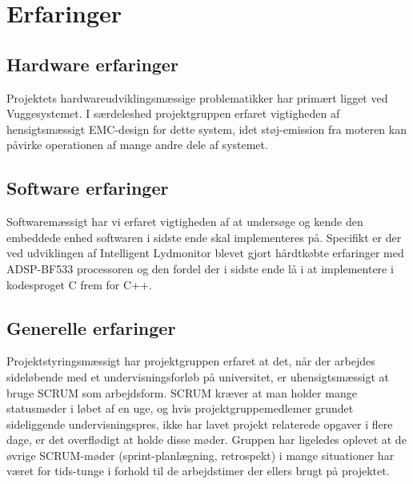 \chapter{Erfaringer}

\section{Hardware erfaringer}
Projektets hardwareudviklingsmæssige problematikker har primært ligget ved Vuggesystemet. I særdeleshed projektgruppen erfaret vigtigheden af hensigtsmæssigt EMC-design for dette system, idet støj-emission fra moteren kan påvirke operationen af mange andre dele af systemet. 

\section{Software erfaringer}
Softwaremæssigt har vi erfaret vigtigheden af at undersøge og kende den embeddede enhed softwaren i sidste ende skal implementeres på. Specifikt er der ved udviklingen af Intelligent Lydmonitor blevet gjort hårdtkøbte erfaringer med ADSP-BF533 processoren og den fordel der i sidste ende lå i at implementere i kodesproget C frem for C++.

\section{Generelle erfaringer}
Projektstyringsmæssigt har projektgruppen erfaret at det, når der arbejdes sideløbende med et undervisningsforløb på universitet, er uhensigtsmæssigt at bruge SCRUM som arbejdsform. SCRUM kræver at man holder mange statusmøder i løbet af en uge, og hvis projektgruppemedlemer grundet sideliggende undervisningspres, ikke har lavet projekt relaterede opgaver i flere dage, er det overflødigt at holde disse møder. Gruppen har ligeledes oplevet at de øvrige SCRUM-møder (sprint-planlægning, retrospekt) i mange situationer har været for tids-tunge i forhold til de arbejdstimer der ellers brugt på projektet.

